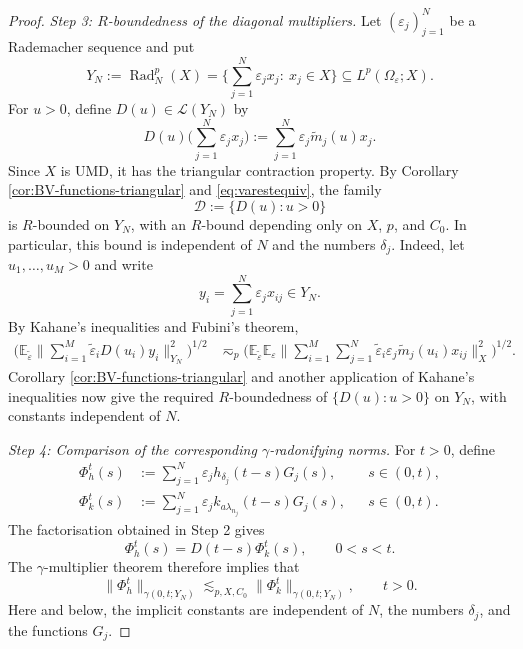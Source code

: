 \documentclass{amsart}
\theoremstyle{plain}
\theoremstyle{remark}
\theoremstyle{plain}
\numberwithin{equation}{section}
\newcommand{\E}{\mathbb E}
\newcommand{\1}{\mathbf 1}
\newcommand{\Rad}{\operatorname{Rad}}
\newcommand{\wt}{\widetilde}
\begin{document}
\begin{proof}
\smallskip
\emph{Step 3: $R$-boundedness of the diagonal multipliers.}
Let $(\varepsilon_j)_{j=1}^N$ be a Rademacher sequence and put
\[
        Y_N:=\Rad_N^p(X)=\Big\{\sum_{j=1}^N\varepsilon_jx_j:\ x_j\in X \Big\}\subseteq L^p(\Omega_\varepsilon;X).
\]
For $u>0$, define $D(u)\in\mathscr L(Y_N)$ by
\[
        D(u)\Big(\sum_{j=1}^N\varepsilon_jx_j\Big):=\sum_{j=1}^N\varepsilon_j\widetilde m_j(u)x_j.
\]
Since $X$ is UMD, it has the triangular contraction property. By
Corollary \ref{cor:BV-functions-triangular} and \eqref{eq:varestequiv}, the family
\[
        \mathscr D:=\{D(u):u>0\}
\]
is $R$-bounded on $Y_N$, with an $R$-bound depending only on
$X$, $p$, and $C_0$. In particular, this bound is independent of
$N$ and  the numbers $\delta_j$.
Indeed, let $u_1,\ldots,u_M>0$ and write
\[
        y_i=\sum_{j=1}^N\varepsilon_jx_{ij}\in Y_N.
\]
By Kahane's inequalities and Fubini's theorem,
\[
\begin{aligned}
\Big(
\E_{\wt\varepsilon}
\Big\|
\sum_{i=1}^M\wt\varepsilon_iD(u_i)y_i
\Big\|_{Y_N}^2
\Big)^{1/2}
&\eqsim_p
\Big(
\E_{\wt\varepsilon}\E_\varepsilon
\Big\|
\sum_{i=1}^M\sum_{j=1}^N
\wt\varepsilon_i\varepsilon_j
\widetilde m_j(u_i)x_{ij}
\Big\|_X^2
\Big)^{1/2}.
\end{aligned}
\]
Corollary \ref{cor:BV-functions-triangular} and another application of
Kahane's inequalities now give the required $R$-boundedness of
$\{D(u):u>0\}$ on $Y_N$, with constants independent of $N$.

\smallskip
\emph{Step 4: Comparison of the corresponding $\gamma$-radonifying norms.}
For $t>0$, define
\begin{align*}
        \Phi_h^t(s)
        &:=
        \sum_{j=1}^N
        \varepsilon_jh_{\delta_j}(t-s)G_j(s),
        &&s\in(0,t),\\
        \Phi_k^t(s)
        &:=
        \sum_{j=1}^N
        \varepsilon_jk_{a\lambda_{n_j}}(t-s)G_j(s),
        &&s\in(0,t).
\end{align*}
The factorisation obtained in Step 2 gives
\[
        \Phi_h^t(s)=D(t-s)\Phi_k^t(s),
        \qquad 0<s<t.
\]
The $\gamma$-multiplier theorem \cite[Theorem 9.5.1]{HNVW2} therefore implies that
\begin{equation}\label{eq:step4est}
        \|\Phi_h^t\|_{\gamma(0,t;Y_N)}
        \lesssim_{p,X,C_0}
        \|\Phi_k^t\|_{\gamma(0,t;Y_N)},
        \qquad t>0.
\end{equation}
Here and below, the implicit constants are independent of
$N$, the numbers $\delta_j$, and the functions $G_j$.


\end{proof}
\end{document}
